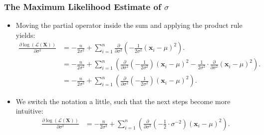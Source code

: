 \begin{frame}
  \frametitle{The Maximum Likelihood Estimate of $\sigma$}
  \begin{itemize}
  \item Moving the partial operator inside the sum and applying the product rule yields:
    \begin{align}
      \frac{\partial \log\left(\mathcal{L}(\mathbf{X})\right)}{\partial \sigma^2} &= -\frac{n}{2\sigma^2} + \sum_{i=1}^{n} \frac{\partial}{\partial\sigma^2}\left(-\frac{1}{2\sigma^2} (\mathbf{x}_i-\mu)^2 \right). \\
                                                                                  &= -\frac{n}{2\sigma^2} + \sum_{i=1}^{n} \left(\frac{\partial}{\partial\sigma^2} \left(-\frac{1}{2\sigma^2}\right) (\mathbf{x}_i-\mu)^2 - \frac{1}{2\sigma^2} \cdot \frac{\partial}{\partial\sigma^2} (\mathbf{x}_i-\mu)^2 \right). \\
                                                                                  &= -\frac{n}{2\sigma^2} + \sum_{i=1}^{n} \left(\frac{\partial}{\partial\sigma^2} \left(-\frac{1}{2\sigma^2}\right) (\mathbf{x}_i-\mu)^2\right).
    \end{align}
  \item We switch the notation a little, such that the next steps become more intuitive:
    \begin{align}
      \frac{\partial \log\left(\mathcal{L}(\mathbf{X})\right)}{\partial \sigma^2} &= -\frac{n}{2\sigma^2} + \sum_{i=1}^{n} \left(\frac{\partial}{\partial\sigma^2} \left(-\frac{1}{2}\cdot \sigma^{-2}\right) (\mathbf{x}_i-\mu)^2\right).
    \end{align}
  \end{itemize}
\end{frame}


